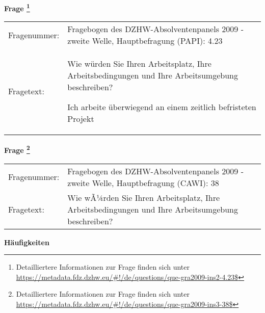 				\vspace*{0.5cm}
                \noindent\textbf{Frage
	                \footnote{Detailliertere Informationen zur Frage finden sich unter
		              \url{https://metadata.fdz.dzhw.eu/\#!/de/questions/que-gra2009-ins2-4.23$}}}\\
				\begin{tabularx}{\hsize}{@{}lX}
					Fragenummer: &
					  Fragebogen des DZHW-Absolventenpanels 2009 - zweite Welle, Hauptbefragung (PAPI):
					  4.23
 \\
					Fragetext: & Wie würden Sie Ihren Arbeitsplatz, Ihre Arbeitsbedingungen und Ihre Arbeitsumgebung beschreiben?\par  Ich arbeite überwiegend an einem zeitlich befristeten Projekt \\
				\end{tabularx}
				\vspace*{0.5cm}
                \noindent\textbf{Frage
	                \footnote{Detailliertere Informationen zur Frage finden sich unter
		              \url{https://metadata.fdz.dzhw.eu/\#!/de/questions/que-gra2009-ins3-38$}}}\\
				\begin{tabularx}{\hsize}{@{}lX}
					Fragenummer: &
					  Fragebogen des DZHW-Absolventenpanels 2009 - zweite Welle, Hauptbefragung (CAWI):
					  38
 \\
					Fragetext: & Wie wÃ¼rden Sie Ihren Arbeitsplatz, Ihre Arbeitsbedingungen und Ihre Arbeitsumgebung beschreiben? \\
				\end{tabularx}





        		\vspace*{0.5cm}
                \noindent\textbf{Häufigkeiten}

